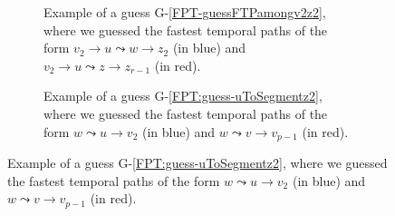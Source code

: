 \documentclass[a4paper,UKenglish,cleveref, autoref, thm-restate]{lipics-v2021}
\begin{document}
%
\begin{figure}[t]
    \centering
	\begin{subfigure}[b]{0.48\textwidth}
		\centering
	\caption{Example of a guess G-\ref{FPT-guessFTPamongv2z2}, where we guessed the fastest temporal paths of the form $v_2 \rightarrow u \leadsto w \rightarrow z_2$ (in blue)
	and $v_2 \rightarrow u \leadsto z \rightarrow z_{r-1}$ (in red).
	\label{fig:FPT-guessG4}}
	\end{subfigure}
	\quad
	\begin{subfigure}[b]{0.48\textwidth}
		\centering
		\caption{Example of a guess G-\ref{FPT:guess-uToSegmentz2}, where we guessed the fastest temporal paths of the form $w \leadsto u \rightarrow v_2$ (in blue) and $w \leadsto v \rightarrow v_{p-1}$ (in red). 
			\label{fig:FPT-guessG5}}
	\end{subfigure}
	

\end{figure}
\end{document}
